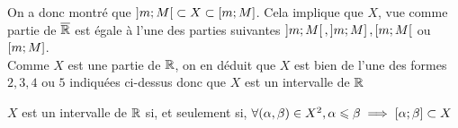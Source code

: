 \begin{dem}
\begin{itemize}
        On a donc montré que \(\left]m;M\right[ \subset X\subset \left[m;M\right]\). Cela implique que \(X\), vue comme partie de \(\overline{\mathbb{R}}\) est égale à l'une des parties suivantes \(\left]m;M\right[,\left]m;M\right],\left[m;M\right[\) ou \(\left[m;M\right]\).\\
        Comme \(X\) est une partie de \(\mathbb{R}\), on en déduit que \(X\) est bien de l'une des formes \( 2, 3, 4\) ou \(5\) indiquées ci-dessus donc que \(X\) est un intervalle de \(\mathbb{R}\)\\
    \end{itemize}
    \conclusion \(X\) est un intervalle de \(\mathbb{R}\) si, et seulement si, \(\forall(\alpha,\beta) \in X^2, \alpha \leqslant \beta \implies \left[\alpha;\beta\right] \subset X\)
\end{dem}